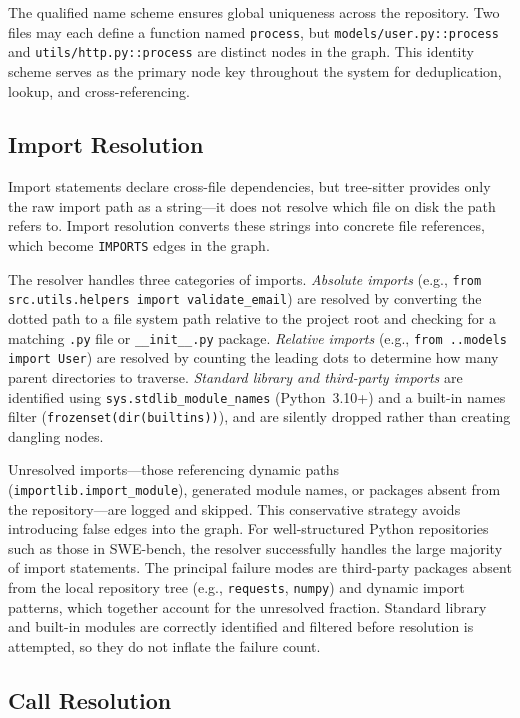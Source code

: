 The qualified name scheme ensures global uniqueness across the repository. Two files may each define a function named \texttt{process}, but \texttt{models/user.py::process} and \texttt{utils/http.py::process} are distinct nodes in the graph. This identity scheme serves as the primary node key throughout the system for deduplication, lookup, and cross-referencing.

\subsection{Import Resolution}
\label{sec:import-resolution}

Import statements declare cross-file dependencies, but tree-sitter provides only the raw import path as a string---it does not resolve which file on disk the path refers to. Import resolution converts these strings into concrete file references, which become \texttt{IMPORTS} edges in the graph.

The resolver handles three categories of imports. \emph{Absolute imports} (e.g., \texttt{from src.utils.helpers import validate\_email}) are resolved by converting the dotted path to a file system path relative to the project root and checking for a matching \texttt{.py} file or \texttt{\_\_init\_\_.py} package. \emph{Relative imports} (e.g., \texttt{from ..models import User}) are resolved by counting the leading dots to determine how many parent directories to traverse. \emph{Standard library and third-party imports} are identified using \texttt{sys.stdlib\_module\_names} (Python~3.10+) and a built-in names filter (\texttt{frozenset(dir(builtins))}), and are silently dropped rather than creating dangling nodes.

Unresolved imports---those referencing dynamic paths (\texttt{importlib.import\_module}), generated module names, or packages absent from the repository---are logged and skipped. This conservative strategy avoids introducing false edges into the graph. For well-structured Python repositories such as those in SWE-bench, the resolver successfully handles the large majority of import statements. The principal failure modes are third-party packages absent from the local repository tree (e.g., \texttt{requests}, \texttt{numpy}) and dynamic import patterns, which together account for the unresolved fraction. Standard library and built-in modules are correctly identified and filtered before resolution is attempted, so they do not inflate the failure count.

\subsection{Call Resolution}
\label{sec:call-resolution}

